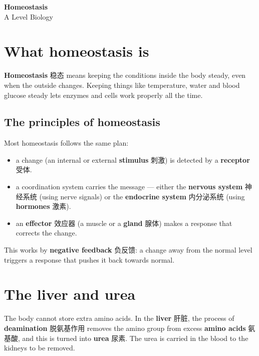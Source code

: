 \documentclass[11pt]{article}
\begin{document}
\begin{center}
  {\LARGE\bfseries Homeostasis}\\[0.35em]
  {\large A Level Biology}
\end{center}
\vspace{0.6em}

\section*{What homeostasis is}

\textbf{Homeostasis} 稳态 means keeping the conditions inside the body steady, even when the outside changes. Keeping things like temperature, water and blood glucose steady lets enzymes and cells work properly all the time.

\subsection*{The principles of homeostasis}

Most homeostasis follows the same plan:

\begin{itemize}
\item a change (an internal or external \textbf{stimulus} 刺激) is detected by a \textbf{receptor} 受体.

\item a coordination system carries the message — either the \textbf{nervous system} 神经系统 (using nerve signals) or the \textbf{endocrine system} 内分泌系统 (using \textbf{hormones} 激素).

\item an \textbf{effector} 效应器 (a muscle or a \textbf{gland} 腺体) makes a response that corrects the change.

\end{itemize}

This works by \textbf{negative feedback} 负反馈: a change away from the normal level triggers a response that pushes it back towards normal.

\section*{The liver and urea}

The body cannot store extra amino acids. In the \textbf{liver} 肝脏, the process of \textbf{deamination} 脱氨基作用 removes the amino group from excess \textbf{amino acids} 氨基酸, and this is turned into \textbf{urea} 尿素. The urea is carried in the blood to the kidneys to be removed.
\end{document}
